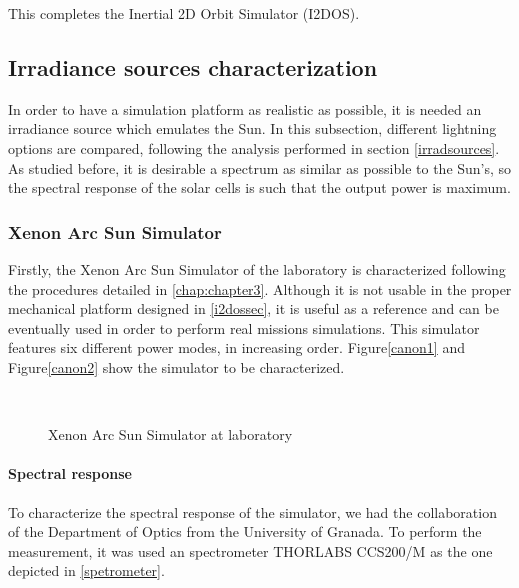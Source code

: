 This completes the Inertial 2D Orbit Simulator (\acrshort{I2DOS}).

\subsection{Irradiance sources characterization} \label{irrasources}

In order to have a simulation platform as realistic as possible, it is needed an irradiance source which emulates the Sun. In this subsection, different lightning options are compared, following the analysis performed in section \ref{irradsources}. As studied before, it is desirable a spectrum as similar as possible to the Sun's, so the spectral response of the solar cells is such that the output power is maximum.

\subsubsection{Xenon Arc Sun Simulator} \label{xenonar}

Firstly, the Xenon Arc Sun Simulator of the  laboratory is characterized following the procedures detailed in \autoref{chap:chapter3}. Although it is not usable in the proper mechanical platform designed in \autoref{i2dossec}, it is useful as a reference and can be eventually used in order to perform real missions simulations. This simulator features six different power modes, in increasing order. Figure\autoref{canon1} and Figure\autoref{canon2} show the simulator to be characterized.

\begin{figure}[H]
			\centering
			 \\
			\caption{Xenon Arc Sun Simulator at  laboratory}
\end{figure}
\newpage
\paragraph{Spectral response} \label{spectral}

To characterize the spectral response of the simulator, we had the collaboration of the  Department of Optics from the University of Granada. To perform the measurement, it was used an spectrometer THORLABS CCS200/M \cite{spectrometro} as the one depicted in \autoref{spetrometer}.

